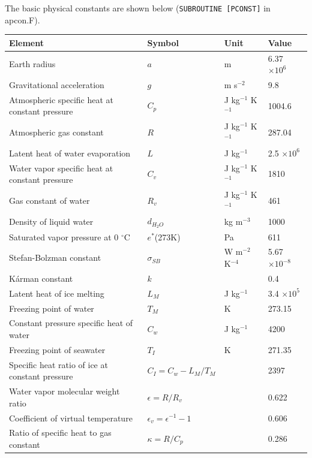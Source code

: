 The basic physical constants are shown below (\texttt{SUBROUTINE~{[}PCONST{]}} in apcon.F).

\begin{longtable}[]{@{}llll@{}}
\toprule
Element & Symbol & Unit & Value\tabularnewline
\midrule
\endhead
Earth radius & \(a\) & m & 6.37 \(\times 10^6\)\tabularnewline
Gravitational acceleration & \(g\) & m s\(^{-2}\) & 9.8\tabularnewline
Atmospheric specific heat at constant pressure & \(C_p\) & J kg\(^{-1}\) K\(^{-1}\) & 1004.6\tabularnewline
Atmospheric gas constant & \(R\) & J kg\(^{-1}\) K\(^{-1}\) & 287.04\tabularnewline
Latent heat of water evaporation & \(L\) & J kg\(^{-1}\) & 2.5 \(\times 10^6\)\tabularnewline
Water vapor specific heat at constant pressure & \(C_v\) & J kg\(^{-1}\) K\(^{-1}\) & 1810\tabularnewline
Gas constant of water & \(R_v\) & J kg\(^{-1}\) K\(^{-1}\) & 461\tabularnewline
Density of liquid water & \(d_{H_2O}\) & kg m\(^{-3}\) & 1000\tabularnewline
Saturated vapor pressure at 0 \(^{\circ}\)C & \(e^*\)(273K) & Pa & 611\tabularnewline
Stefan-Bolzman constant & \(\sigma_{SB}\) & W m\(^{-2}\) K\(^{-4}\) & 5.67 \(\times 10^{-8}\)\tabularnewline
Kárman constant & \(k\) & & 0.4\tabularnewline
Latent heat of ice melting & \(L_M\) & J kg\(^{-1}\) & 3.4 \(\times 10^5\)\tabularnewline
Freezing point of water & \(T_M\) & K & 273.15\tabularnewline
Constant pressure specific heat of water & \(C_w\) & J kg\(^{-1}\) & 4200\tabularnewline
Freezing point of seawater & \(T_I\) & K & 271.35\tabularnewline
Specific heat ratio of ice at constant pressure & \(C_I = C_w - L_M/T_M\) & & 2397\tabularnewline
Water vapor molecular weight ratio & \(\epsilon = R/R_v\) & & 0.622\tabularnewline
Coefficient of virtual temperature & \(\epsilon_v = \epsilon^{-1} - 1\) & & 0.606\tabularnewline
Ratio of specific heat to gas constant & \(\kappa = R/C_p\) & & 0.286\tabularnewline
\bottomrule
\end{longtable}
